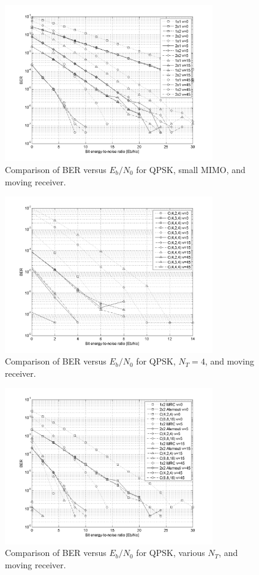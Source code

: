 \begin{figure}[p]
  \centering
  \includegraphics[width=0.8\textwidth]{images/result4a.png}
  \caption{Comparison of BER versus $E_b/N_0$ for QPSK, small MIMO, and moving receiver.}
  \label{fig:result4a}
\end{figure}

\begin{figure}[p]
  \centering
  \includegraphics[width=0.8\textwidth]{images/result4b.png}
  \caption{Comparison of BER versus $E_b/N_0$ for QPSK, $N_T=4$, and moving receiver.}
  \label{fig:result4b}
\end{figure}

\begin{figure}[p]
  \centering
  \includegraphics[width=0.8\textwidth]{images/result5.png}
  \caption{Comparison of BER versus $E_b/N_0$ for QPSK, various $N_T$, and moving receiver.}
  \label{fig:result5}
\end{figure}